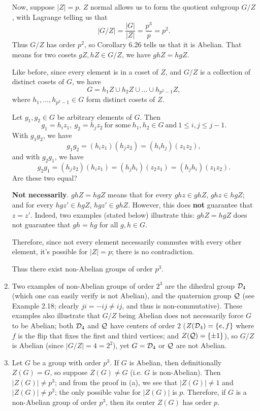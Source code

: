 \documentclass{homework}
\begin{document}
\begin{solution}
\begin{enumerate}[label=(\alph*)]
      Now, suppose $\left| Z \right| =p$. $Z$ normal allows us to form the quotient subgroup $G /
      Z$, with Lagrange telling us that \[
        \left| G / Z \right|  = \frac{\left| G \right| }{\left| Z \right| }=\frac{p^3}{p}=p^2
      .\] Thus $G / Z$ has order $p^2$, so Corollary 6.26 tells us that it is Abelian. That means
      for two cosets $gZ,hZ\in G / Z$, we have $ghZ=hgZ$.

      Like before, since every element is in a coset of $Z$, and $G / Z$ is a collection of distinct
      cosets of $G$, we have \[
        G = h_1Z\cup h_2Z\cup \ldots\cup h_{p^2-1}Z
      ,\] where $h_1,\ldots,h_{p^2-1}\in G$ form distinct cosets of $Z$.

      Let $g_1,g_2\in G$ be arbitrary elements of $G$. Then \[
        g_1=h_iz_1,\ g_2=h_jz_2~\text{for some}~h_1,h_2\in G~\text{and}~1\le i,j\le j-1
      .\] With $g_1g_2$, we have \[
      g_1g_2=(h_iz_1)(h_jz_2)=(h_ih_j)(z_1z_2)
      ,\] and with $g_2g_1$, we have \[
      g_2g_1=(h_jz_2)(h_iz_1)=(h_jh_i)(z_2z_1)=(h_jh_i)(z_1z_2)
      .\] Are these two equal?

      \textbf{Not necessarily}. $ghZ=hgZ$ means that for every $ghz\in ghZ$, $ghz\in hgZ$; and for
      every $hgz'\in hgZ$, $hgz'\in ghZ$. However, this does \textbf{not} guarantee that $z=z'$.
      Indeed, two examples (stated below) illustrate this: $ghZ=hgZ$ does not guarantee
      that $gh=hg$ for all $g,h\in G$.

      Therefore, since not every element necessarily commutes with every other element, it's
      possible for $\left| Z \right| =p$; there is no contradiction.

      Thus there exist non-Abelian groups of order $p^3$.



    \item Two examples of non-Abelian groups of order $2^3$ are the dihedral group $\mathcal{D}_4$ (which one
      can easily verify is not Abelian), and the quaternion group $\mathcal{Q}$ (see Example 2.18;
      clearly $ji=-ij\neq ij$, and thus is non-commutative). These examples also illustrate that $G
      / Z$ being Abelian does not necessarily force $G$ to be Abelian; both $\mathcal{D}_4$ and $\mathcal{Q}$ have
      centers of order $2$ ($Z(\mathcal{D}_4)=\{ e,f \}$ where $f$ is the flip that fixes the first and third
      vertices; and $Z(\mathcal{Q})=\{ \pm 1 \}$), so $G / Z$ is Abelian (since $\left| G / Z \right|
      =4=2^2$), yet $G=\mathcal{D}_4$ or $\mathcal{Q}$ are not Abelian.

    \item Let $G$ be a group with order $p^3$. If $G$ is Abelian, then definitionally $Z(G)=G$, so
      suppose $Z(G)\neq G$ (i.e. $G$ is non-Abelian). Then $\left| Z(G) \right| \neq p^3$; and from
      the proof in (a), we see that $\left| Z(G) \right| \neq 1$ and $\left| Z(G) \right| \neq p^2$;
      the only possible value for $\left| Z(G) \right| $ is $p$. Therefore, if $G$ is a non-Abelian
      group of order $p^3$, then its center $Z(G)$ has order $p$.
  \end{enumerate}
\end{solution}
\end{document}
